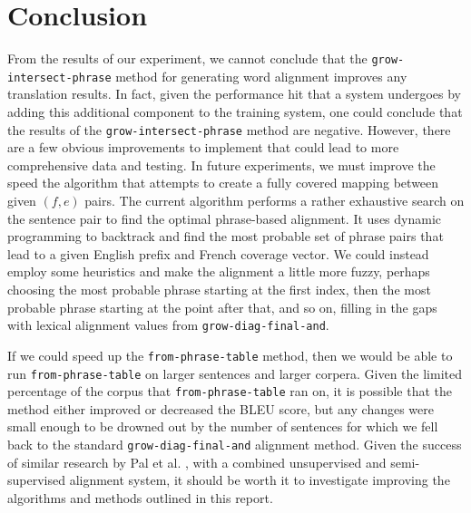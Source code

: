 \documentclass[twocolumn]{article}
\newcommand{\originalAlign}{\texttt{grow-diag-final-and}}
\newcommand{\phraseAlign}{\texttt{from-phrase-table}}
\newcommand{\phraseIntersectAlign}{\texttt{grow-intersect-phrase}}
\begin{document}
\section{Conclusion}
From the results of our experiment, we cannot conclude that the
\phraseIntersectAlign{} method for generating word alignment improves any
translation results. In fact, given the performance hit that a system undergoes
by adding this additional component to the training system, one could conclude
that the results of the \phraseIntersectAlign{} method are negative.
However, there are a few obvious improvements to implement that could lead to
more comprehensive data and testing. In future experiments, we must improve the
speed the algorithm that attempts to create a fully covered mapping between
given $(f, e)$ pairs. The current algorithm performs a rather exhaustive search
on the sentence pair to find the optimal phrase-based alignment. It uses dynamic
programming to backtrack and find the most probable set of phrase pairs that
lead to a given English prefix and French coverage vector.
We could instead employ some heuristics and make the alignment a little more
fuzzy, perhaps choosing the most probable phrase starting at the first index,
then the most probable phrase starting at the point after that, and so on,
filling in the gaps with lexical alignment values from \originalAlign{}.

If we could speed up the \phraseAlign{} method, then we would be able to run
\phraseAlign{} on larger sentences and larger corpera. Given the limited
percentage of the corpus that \phraseAlign{} ran on, it is possible that the
method either improved or decreased the BLEU score, but any changes were small
enough to be drowned out by the number of sentences for which we fell back to
the standard \originalAlign{} alignment method. Given the success of
similar research by Pal et al. \cite{pnb2013}, with a combined unsupervised and
semi-supervised alignment system, it should be worth it to investigate improving
the algorithms and methods outlined in this report.
\end{document}
